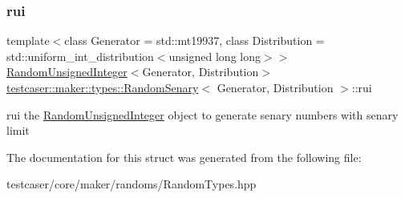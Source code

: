 \subsubsection{\texorpdfstring{rui}{rui}}
{\footnotesize\ttfamily template$<$class Generator = std\+::mt19937, class Distribution = std\+::uniform\+\_\+int\+\_\+distribution$<$unsigned long long$>$$>$ \\
\mbox{\hyperlink{classtestcaser_1_1maker_1_1types_1_1RandomUnsignedInteger}{Random\+Unsigned\+Integer}}$<$Generator, Distribution$>$ \mbox{\hyperlink{structtestcaser_1_1maker_1_1types_1_1RandomSenary}{testcaser\+::maker\+::types\+::\+Random\+Senary}}$<$ Generator, Distribution $>$\+::rui}



rui the \mbox{\hyperlink{classtestcaser_1_1maker_1_1types_1_1RandomUnsignedInteger}{Random\+Unsigned\+Integer}} object to generate senary numbers with senary limit 



The documentation for this struct was generated from the following file\+:\begin{DoxyCompactItemize}
\item 
testcaser/core/maker/randoms/Random\+Types.\+hpp\end{DoxyCompactItemize}
